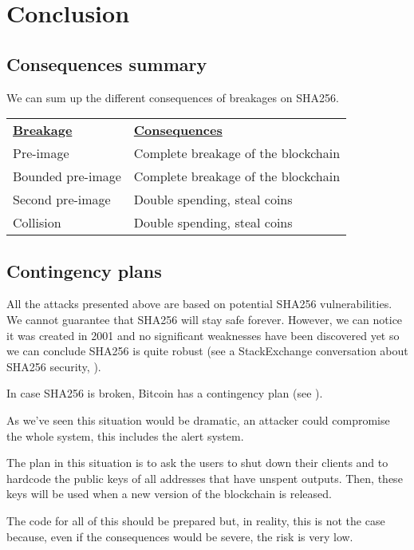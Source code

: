 \section{Conclusion}

  \subsection{Consequences summary}

We can sum up the different consequences of breakages on SHA256. \newline

\begin{tabular}{ll}

  \underline{\textbf{Breakage}} & \underline{\textbf{Consequences}} \\
  Pre-image & Complete breakage of the blockchain \\
  Bounded pre-image & Complete breakage of the blockchain \\
  Second pre-image & Double spending, steal coins \\
  Collision & Double spending, steal coins \\

\end{tabular}

  \subsection{Contingency plans}

All the attacks presented above are based on potential SHA256 vulnerabilities. We cannot guarantee that SHA256 will stay safe forever. However, we can notice it was created in 2001 and no significant weaknesses have been discovered yet so we can conclude SHA256 is quite robust (see a StackExchange conversation about SHA256 security, \cite{SHA256_security}). \newline

In case SHA256 is broken, Bitcoin has a contingency plan (see \cite{contingency}).

As we've seen this situation would be dramatic, an attacker could compromise the whole system, this includes the alert system.

The plan in this situation is to ask the users to shut down their clients and to hardcode the public keys of all addresses that have unspent outputs. Then, these keys will be used when a new version of the blockchain is released. \newline

The code for all of this should be prepared but, in reality, this is not the case because, even if the consequences would be severe, the risk is very low.
